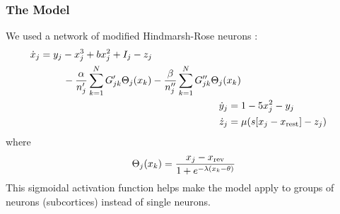 \documentclass[hyperref={hidelinks}]{beamer}
\newcommand*{\hrx}{x}
\newcommand*{\hry}{y}
\newcommand*{\hrz}{z}
\newcommand*{\hra}{\alpha}
\newcommand*{\hrb}{\beta}
\begin{document}
\begin{frame}
  \frametitle{The Model}
  We used a network of modified Hindmarsh-Rose neurons \cite{Santos2017}:
  \begin{align}
    \label{eq:hr_x}
    \begin{split}
      \dot{\hrx}_{j}
      ={}&
      \hry_{j}
      -
      \hrx_{j}^{3}
      +
      b \hrx_{j}^{2}
      +
      I_{j}
      -
      \hrz_{j} \\
      &\quad -
      \frac{\hra}{n'_{j}} \sum_{k ={} 1}^{N} G'_{j k} \Theta_{j}(\hrx_{k})
      -
      \frac{\hrb}{n''_{j}} \sum_{k ={} 1}^{N} G''_{j k} \Theta_{j}(\hrx_{k})
    \end{split} \\
    \label{eq:hr_y}
    \dot{\hry}_{j}
    ={}&
         1
         -
         5 \hrx_{j}^{2}
         -
         \hry_{j} \\
    \label{eq:hr_z}
    \dot{\hrz}_{j}
    ={}&
         \mu \pqty{s \bqty{\hrx_{j} - \hrx_{\text{rest}}} - \hrz_{j}}
  \end{align}
  where
  \begin{equation}
    \label{eq:hr_sigmoid}
    \Theta_{j}(\hrx_{k})
    =
    \frac{\hrx_{j} - \hrx_{\text{rev}}}{1 + e^{-\lambda \pqty{\hrx_{k} - \theta}}}
  \end{equation}
  This sigmoidal activation function helps make the model apply to groups of neurons (subcortices) instead of single neurons.

\end{frame}
\end{document}
